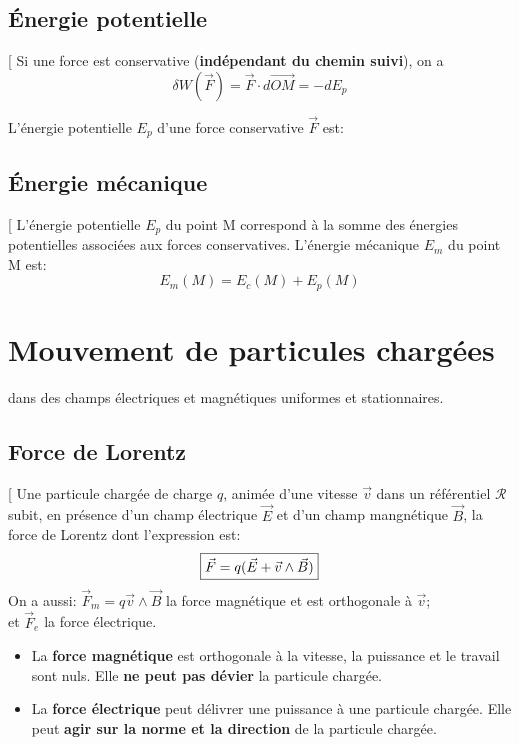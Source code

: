 \documentclass[12pt,hidelinks]{article}
\begin{document}
    \subsection{Énergie potentielle}
        \begin{DashedDefinition}{}[
            Si une force est conservative (\textbf{indépendant du chemin suivi}), on a 
            \[\delta W (\vec F) = \vec F \cdot d \overrightarrow{OM} = -d E_p\]
        \end{DashedDefinition}
        L'énergie potentielle $E_p$ d'une force conservative $\vec F$ est: 

    \subsection{Énergie mécanique}
        \begin{DashedDefinition}{}[
            L'énergie potentielle $E_p$ du point M correspond à la somme des énergies potentielles associées aux forces conservatives. L'énergie mécanique $E_m$ du point M est:
            \[E_m(M)=E_c(M)+E_p(M)\]
        \end{DashedDefinition}
\newpage
\section{Mouvement de particules chargées}
\vspace{2cm}
 dans des champs électriques et magnétiques uniformes et stationnaires.  \\

    \subsection{Force de Lorentz}
    \begin{DashedDefinition}{}[
        Une particule chargée de charge $q$, animée d'une vitesse $\vec v$ dans un référentiel $\mathcal{R}$ subit, en présence d'un champ électrique $\vec E$ et d'un champ mangnétique $\vec B$, la force de Lorentz dont l'expression est:
        \[\fbox{$\vec F = q(\vec E + \vec v \wedge \vec B)$}\]
        On a aussi: $\vec F_m = q \vec v \wedge \vec B$ la force magnétique et est orthogonale à $\vec v$; \\ et $\vec F_e$ la force électrique.
    \end{DashedDefinition}
    \begin{itemize}
        \item La \textbf{force magnétique} est orthogonale à la vitesse, la puissance et le travail sont nuls. Elle \textbf{ne peut pas dévier} la particule chargée.
        \item La \textbf{force électrique} peut délivrer une puissance à une particule chargée. Elle peut \textbf{agir sur la norme et la direction} de la particule chargée.
    \end{itemize}
\end{document}
